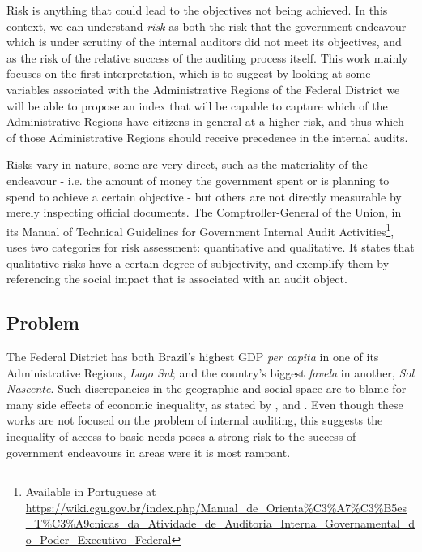 \documentclass[conference]{IEEEtran}
\begin{document}
Risk is anything that could lead to the objectives not being achieved. In this context, we can understand \textit{risk} as both the risk that the government endeavour which is under scrutiny of the internal auditors did not meet its objectives, and as the risk of the relative success of the auditing process itself. This work mainly focuses on the first interpretation, which is to suggest by looking at some variables associated with the Administrative Regions of the Federal District we will be able to propose an index that will be capable to capture which of the Administrative Regions have citizens in general at a higher risk, and thus which of those Administrative Regions should receive precedence in the internal audits. 

Risks vary in nature, some are very direct, such as the materiality of the endeavour - i.e. the amount of money the government spent or is planning to spend to achieve a certain objective - but others are not directly measurable by merely inspecting official documents. The Comptroller-General of the Union, in its Manual of Technical Guidelines for Government Internal Audit Activities\footnote{Available in Portuguese at \url{https://wiki.cgu.gov.br/index.php/Manual_de_Orienta\%C3\%A7\%C3\%B5es_T\%C3\%A9cnicas_da_Atividade_de_Auditoria_Interna_Governamental_do_Poder_Executivo_Federal}}, uses two categories for risk assessment: quantitative and qualitative. It states that qualitative risks have a certain degree of subjectivity, and exemplify them by referencing the social impact that is associated with an audit object. 

\subsection{Problem}

The Federal District has both Brazil's highest GDP \textit{per capita} in one of its Administrative Regions, \textit{Lago Sul}; and the country's biggest \textit{favela} in another, \textit{Sol Nascente}. Such discrepancies in the geographic and social space are to blame for many side effects of economic inequality, as stated by \cite{pattussi2001social}, \cite{azzoni2002education} and \cite{sachsida2010inequality}. Even though these works are not focused on the problem of internal auditing, this suggests the inequality of access to basic needs poses a strong risk to the success of government endeavours in areas were it is most rampant.
\end{document}
